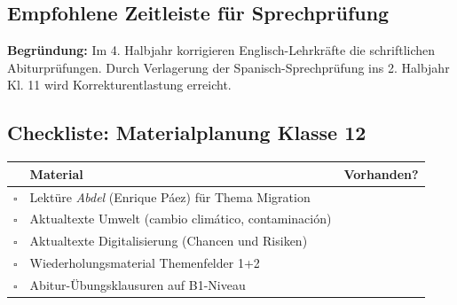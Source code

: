 \documentclass[10pt,a4paper]{article}
\begin{document}
\subsection{Empfohlene Zeitleiste für Sprechprüfung}

\begin{center}
\end{center}

\textbf{Begründung:} Im 4. Halbjahr korrigieren Englisch-Lehrkräfte die schriftlichen Abiturprüfungen. Durch Verlagerung der Spanisch-Sprechprüfung ins 2. Halbjahr Kl. 11 wird Korrekturentlastung erreicht.

\subsection{Checkliste: Materialplanung Klasse 12}

\begin{center}
\begin{tabular}{|c|p{8cm}|c|}
\hline
\rowcolor{lightgray}
& \textbf{Material} & \textbf{Vorhanden?} \\
\hline
$\square$ & Lektüre \textit{Abdel} (Enrique Páez) für Thema Migration & \\
\hline
$\square$ & Aktualtexte Umwelt (cambio climático, contaminación) & \\
\hline
$\square$ & Aktualtexte Digitalisierung (Chancen und Risiken) & \\
\hline
$\square$ & Wiederholungsmaterial Themenfelder 1+2 & \\
\hline
$\square$ & Abitur-Übungsklausuren auf B1-Niveau & \\
\hline
\end{tabular}
\end{center}
\end{document}
